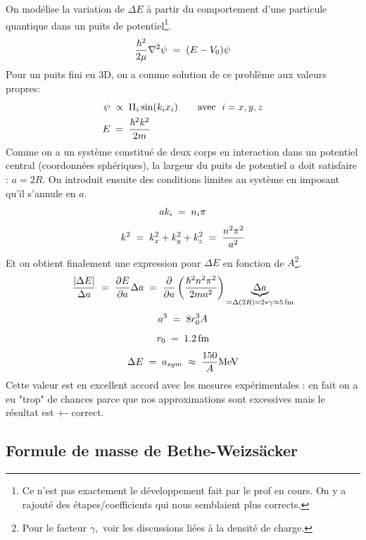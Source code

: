 On modélise la variation de $\Delta E$ à partir du comportement d'une particule quantique dans un puits de potentiel\footnote{Ce n'est pas exactement le développement fait par le prof en cours. On y a rajouté des étapes/coefficients qui nous semblaient plus corrects.}.\\
\[
    \dfrac{\hbar^2}{2\mu}\nabla^2 \psi \eq (E- V_0)\psi
\]
Pour un puits fini en 3D, on a comme solution de ce problème aux valeurs propres:
\begin{align*}
    \psi &\;\propto\; 
    \Pi_i \sin(k_i x_i) \qquad \text{avec }\; i ={x,y,z}\\
    E &\eq \dfrac{\hbar^2 k^2}{2m}
\end{align*}
Comme on a un système constitué de deux corps en interaction dans un potentiel central (coordonnées sphériques), la largeur du puits de potentiel $a$ doit satisfaire : $a = 2R$. On introduit ensuite des conditions limites au système en imposant qu'il s'annule en $a$.
\[
    ak_i \eq n_i \pi
\]
\[
    k^2 \eq k_x^2 + k_y^2 + k_z^2 \eq \dfrac{n^2\pi^2}{a^2}
\]
Et on obtient finalement une expression pour $\Delta E$ en fonction de $A$\footnote{Pour le facteur $\gamma,$ voir les discussions liées à la densité de charge.}.
\[
    \dfrac{|\Delta E|}{\Delta a} 
    \eq \dfrac{\partial E}{\partial a}\Delta a
    \eq \dfrac{\partial}{\partial a}\left( \dfrac{\hbar^2n^2\pi^2}{2ma^2}\right)\underbrace{\Delta a}_{=\Delta(2R)= 2*\gamma\approx \SI{5}{fm}}
\]
\[
    a^3 \eq 8r_0^3 A
\]
\[
    r_0 \eq \SI{1.2}{fm}
\]
\[
    \Delta E \eq a_{sym} \;\approx\; \dfrac{150}{A}\si{MeV}
\]
Cette valeur est en excellent accord avec les mesures expérimentales : en fait on a eu "trop" de chances parce que nos approximations sont excessives mais le résultat est +- correct.





\subsection{Formule de masse de Bethe-Weizsäcker}


